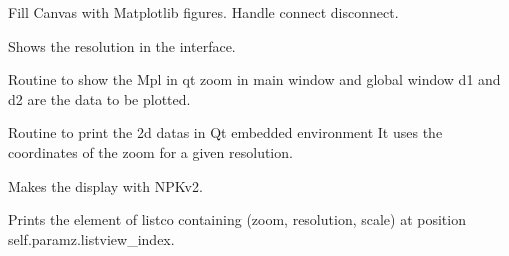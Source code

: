 \documentclass[letterpaper,10pt,openany,oneside]{sphinxmanual}
\begin{document}
\begin{fulllineitems}
\label{rst/visu2d:Visu.display.DISPLAY}
Fill Canvas with Matplotlib figures.
Handle connect disconnect.

\begin{fulllineitems}
\label{rst/visu2d:Visu.display.DISPLAY.aff_resolution}
Shows the resolution in the interface.

\end{fulllineitems}


\begin{fulllineitems}
\label{rst/visu2d:Visu.display.DISPLAY.affd}
Routine to show the Mpl in qt zoom in main window and global window
d1 and d2 are the data to be plotted.

\end{fulllineitems}


\begin{fulllineitems}
\label{rst/visu2d:Visu.display.DISPLAY.affi}
Routine to print the 2d datas in Qt embedded environment
It uses the coordinates of the zoom for a given resolution.

\end{fulllineitems}


\begin{fulllineitems}
\label{rst/visu2d:Visu.display.DISPLAY.affichd}
Makes the display with NPKv2.

\end{fulllineitems}


\begin{fulllineitems}
\label{rst/visu2d:Visu.display.DISPLAY.afflistco}
Prints the element of listco containing (zoom, resolution, scale)
at position self.paramz.listview\_index.


\end{fulllineitems}
\end{fulllineitems}
\end{document}
